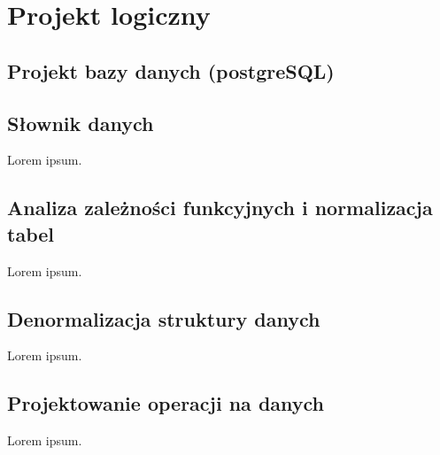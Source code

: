 \chapter{Projekt logiczny}
\label{cha:logiczny}

\section{Projekt bazy danych (postgreSQL)}
\label{sec:bazadanych}




\section{Słownik danych}
\label{sec:slownik}

Lorem ipsum.


\section{Analiza zależności funkcyjnych i normalizacja tabel}
\label{sec:normalizacja}

Lorem ipsum.


\section{Denormalizacja struktury danych}
\label{sec:denormalizacja}

Lorem ipsum.


\section{Projektowanie operacji na danych}
\label{sec:operacje}

Lorem ipsum.